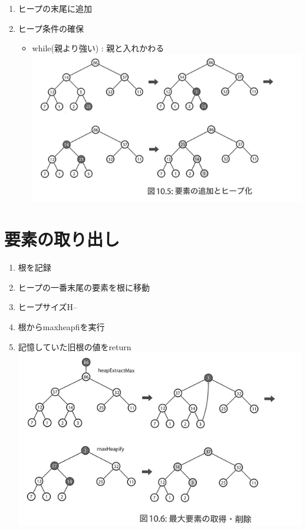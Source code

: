 \documentclass[a4paper,dvipdfmx]{jsarticle}
\makeatletter
\def\maxwidth{\ifdim\Gin@nat@width>\linewidth\linewidth
    \else\Gin@nat@width\fi}
\let\Oldincludegraphics\includegraphics
\renewcommand{\includegraphics}[1]{\Oldincludegraphics[width=.8\maxwidth]{#1}}
\providecommand{\tightlist}{%
      \setlength{\itemsep}{0pt}\setlength{\parskip}{0pt}}
\makeatother
\begin{document}
\begin{enumerate}
\def\labelenumi{\arabic{enumi}.}
\tightlist
\item
  ヒープの末尾に追加
\item
  ヒープ条件の確保

  \begin{itemize}
  \tightlist
  \item
    while(親より強い) : 親と入れかわる
    \includegraphics{./imgs/insertPQ.png}
  \end{itemize}
\end{enumerate}

    \section{要素の取り出し}\label{ux8981ux7d20ux306eux53d6ux308aux51faux3057}

\begin{enumerate}
\def\labelenumi{\arabic{enumi}.}
\tightlist
\item
  根を記録
\item
  ヒープの一番末尾の要素を根に移動
\item
  ヒープサイズH--
\item
  根からmaxheapfiを実行
\item
  記憶していた旧根の値をreturn \includegraphics{imgs/popPQ.png}
\end{enumerate}
\end{document}
